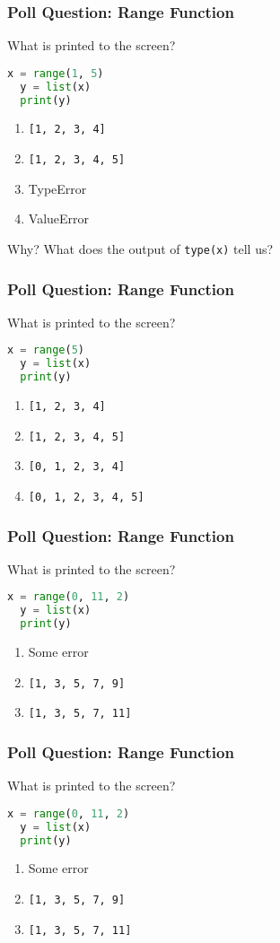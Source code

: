 \documentclass{beamer}
\begin{document}
%
%
\begin{frame}[fragile]
  \frametitle{Poll Question: Range Function}
  What is printed to the screen?
  \begin{lstlisting}[language=Python, autogobble]
  x = range(1, 5)
  y = list(x)
  print(y)
  \end{lstlisting}
  \vfill
  \begin{enumerate}[A]
    \item \lstinline|[1, 2, 3, 4]|
    \item \lstinline|[1, 2, 3, 4, 5]|
    \item TypeError
    \item ValueError
  \end{enumerate}
  \vfill \pause
  Why? What does the output of \lstinline|type(x)| tell us?
\end{frame}

%
%
\begin{frame}[fragile]
  \frametitle{Poll Question: Range Function}
  What is printed to the screen?
  \begin{lstlisting}[language=Python, autogobble]
  x = range(5)
  y = list(x)
  print(y)
  \end{lstlisting}
  \vfill
  \begin{enumerate}[A]
    \item \lstinline|[1, 2, 3, 4]|
    \item \lstinline|[1, 2, 3, 4, 5]|
    \item \lstinline|[0, 1, 2, 3, 4]|
    \item \lstinline|[0, 1, 2, 3, 4, 5]|
  \end{enumerate}
\end{frame}

%
%
\begin{frame}[fragile]
  \frametitle{Poll Question: Range Function}
  What is printed to the screen?
  \begin{lstlisting}[language=Python, autogobble]
  x = range(0, 11, 2)
  y = list(x)
  print(y)
  \end{lstlisting}
  \vfill
  \begin{enumerate}[A]
    \item Some error
    \item \lstinline|[1, 3, 5, 7, 9]|
    \item \lstinline|[1, 3, 5, 7, 11]|
  \end{enumerate}
\end{frame}

%
%
\begin{frame}[fragile]
  \frametitle{Poll Question: Range Function}
  What is printed to the screen?
  \begin{lstlisting}[language=Python, autogobble]
  x = range(0, 11, 2)
  y = list(x)
  print(y)
  \end{lstlisting}
  \vfill
  \begin{enumerate}[A]
    \item Some error
    \item \lstinline|[1, 3, 5, 7, 9]|
    \item \lstinline|[1, 3, 5, 7, 11]|
  \end{enumerate}
\end{frame}
\end{document}
